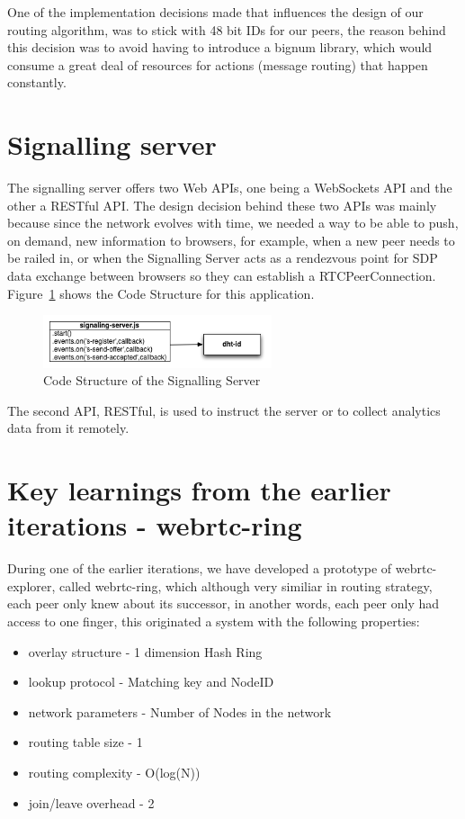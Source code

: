 One of the implementation decisions made that influences the design of our routing algorithm, was to stick with 48 bit IDs for our peers, the reason behind this decision was to avoid having to introduce a bignum library, which would consume a great deal of resources for actions (message routing) that happen constantly.

\section{Signalling server}

The signalling server offers two Web APIs, one being a WebSockets API and the other a RESTful API. The design decision behind these two APIs was mainly because since the network evolves with time, we needed a way to be able to push, on demand, new information to browsers, for example, when a new peer needs to be railed in, or when the Signalling Server acts as a rendezvous point for SDP data exchange between browsers so they can establish a RTCPeerConnection. Figure~\ref{fig:d-s-s} shows the Code Structure for this application.

\begin{figure}[h!]
  \centering
  \includegraphics[width=0.6\textwidth]{figs/diagram-signalling-server}
  \caption{Code Structure of the Signalling Server}
  \label{fig:d-s-s}
\end{figure}

The second API, RESTful, is used to instruct the server or to collect analytics data from it remotely.

\section{Key learnings from the earlier iterations - webrtc-ring}

During one of the earlier iterations, we have developed a prototype of webrtc-explorer, called webrtc-ring, which although very similiar in routing strategy, each peer only knew about its successor, in another words, each peer only had access to one finger, this originated a system with the following properties:

\begin{itemize}
    \item overlay structure - 1 dimension Hash Ring
    \item lookup protocol - Matching key and NodeID
    \item network parameters - Number of Nodes in the network
    \item routing table size - 1
    \item routing complexity - O(log(N))
    \item join/leave overhead - 2
\end{itemize}

